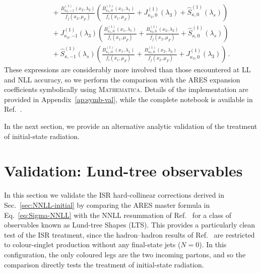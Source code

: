 \begin{equation}
\begin{aligned}
    &\qquad +\frac{B_{\kappa_2,-1}^{(1)}(x_2,\lambda_2)}{f_j(x_2,\mu_F)}\left(\frac{B_{\kappa_1,0}^{(1)}(x_1,\lambda_1)}{f_i(x_1,\mu_F)}+J_{\kappa_3,0}^{(1)}(\lambda_3)
    +\widehat{S}^{(1)}_{\kappa,0}(\lambda_s)\right)\\[0.5ex]
    &\qquad +J_{\kappa_3,-1}^{(1)}(\lambda_3)\left(\frac{B_{\kappa_1,0}^{(1)}(x_1,\lambda_1)}{f_i(x_1,\mu_F)}+\frac{B_{\kappa_2,0}^{(1)}(x_2,\lambda_2)}{f_j(x_2,\mu_F)}+\widehat{S}^{(1)}_{\kappa,0}(\lambda_s)\right)\\[0.5ex]
    &\qquad +\widehat{S}^{(1)}_{\kappa,-1}(\lambda_s)\left(\frac{B_{\kappa_1,0}^{(1)}(x_1,\lambda_1)}{f_i(x_1,\mu_F)}+\frac{B_{\kappa_2,0}^{(1)}(x_2,\lambda_2)}{f_j(x_2,\mu_F)}+J_{\kappa_3,0}^{(1)}(\lambda_3)\right)\,.
\end{aligned}
\end{equation}
These expressions are considerably more involved than those encountered at
LL and NLL accuracy, so we perform the comparison with the \textsc{ARES}
expansion coefficients symbolically using \textsc{Mathematica}. Details of the
implementation are provided in Appendix~\ref{ap:symb-val}, while the complete
notebook is available in Ref.~\cite{peake2026validation}.

In the next section, we provide an alternative analytic validation of
the treatment of initial-state radiation.

\section{Validation: Lund-tree observables}
\label{sec:LTS-val}

In this section we validate the ISR hard-collinear corrections derived in
Sec.~\ref{sec:NNLL-initial} by comparing the \textsc{ARES} master formula in
Eq.~\eqref{eq:Sigma-NNLL} with the NNLL resummation of Ref.~\cite{vanBeekveld:2025zjh} for a class
of observables known as Lund-tree Shapes (LTS). This provides
a particularly clean test of the ISR treatment, since the hadron--hadron
results of Ref.~\cite{vanBeekveld:2025zjh} are restricted to colour-singlet
production without any final-state jets ($N=0$). In this configuration, 
the only coloured legs are the two incoming partons, and so
the comparison directly tests the treatment of initial-state radiation.

